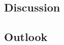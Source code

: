 \hypertarget{discussion}{%
\subsection{Discussion}\label{discussion}}

\hypertarget{outlook}{%
\subsection{Outlook}\label{outlook}}
